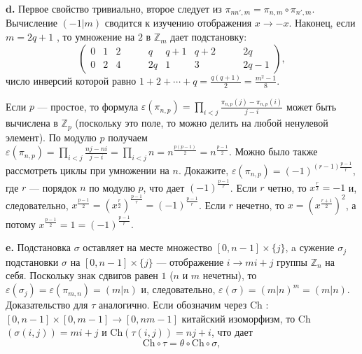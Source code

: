 \documentclass{mai_book}
\begin{document}
\textbf{d. } Первое свойство тривиально, второе следует из ${\pi}_{n n', m} = {\pi}_{n,m} \circ {\pi}_{n',m}$. Вычисление $(-1 | m)$ сводится к изучению отображения $x \to -x$. Наконец, если $m = 2q + 1$ , то умножение на $2$ в $\mathbb{Z}_m$ дает подстановку:
$$ \begin{pmatrix}
	0& 1& 2& \qquad q& q+1& q+2& \qquad 2q \\
	0& 2& 4& \qquad 2q& 1& 3& \qquad 2q-1
\end{pmatrix}, $$
число инверсий которой равно $1+2+ \cdots +q = \frac{q(q+1)}{2} = \frac{m^2-1}{8}$. \par
Если $p$ --- простое, то формула $\varepsilon ({\pi}_{n,p}) = \prod_{i < j} \frac{{\pi}_{n,p} (j) - {\pi}_{n,p} (i)}{j-i}$ может быть вычислена в $\mathbb{Z}_p$ (поскольку это поле, то можно делить на  любой ненулевой элемент). По модулю $p$ получаем $\varepsilon ({\pi}_{n,p}) = \prod_{i<j} \frac{nj-ni}{j-i} = \prod_{i<j} n = n^{\frac{p(p-1)}{2}} = n^{\frac{p-1}{2}}$. Можно было также рассмотреть циклы при умножении на $n$. Докажите, $\varepsilon ({\pi}_{n,p}) = (-1)^{(r-1) \frac{p-1}{r}}$, где $r$ --- порядок $n$ по модулю $p$, что дает $(-1)^{\frac{p-1}{r}}$. Если $r$ четно, то $x^{\frac{r}{2}} = -1$ и, следовательно, $x^{\frac{p-1}{2}} = (x^{\frac{r}{2}})^{\frac{p-1}{r}} = (-1)^{\frac{p-1}{r}}$. Если $r$ нечетно, то $x = (x^{\frac{r+1}{2}})^2$, а потому $x^{\frac{p-1}{2}} = 1 = (-1)^{\frac{p-1}{r}}$. \smallskip

\textbf{e. } Подстановка $\sigma$ оставляет на месте множество $[0,n-1] \times \{j\}$, a сужение ${\sigma}_j$ подстановки $\sigma$ на $[0,n-1] \times \{j\}$ --- отображение $i \to mi + j$ группы $\mathbb{Z}_n$ на себя. Поскольку знак сдвигов равен $1$ ($n$ и $m$ нечетны), то $\varepsilon ({\sigma}_j) = \varepsilon ({\pi}_{m,n}) = (m|n)$ и, следовательно, $\varepsilon (\sigma) = (m|n)^m = (m|n)$. Доказательство для $\tau$ аналогично. Если обозначим через Ch : $[0,n-1] \times [0,m-1] \to [0,nm-1]$ китайский изоморфизм, то Ch$(\sigma (i,j)) = mi+j$ и Ch$(\tau(i,j)) = nj + i$, что дает
\begin{equation*}
	\text{Ch} \circ \tau = \theta \circ \text{Ch} \circ \sigma,
\end{equation*} 
 \smallskip
\end{document}
